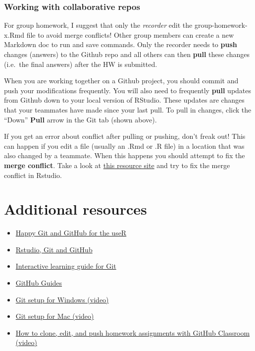 \documentclass[
]{book}
\providecommand{\tightlist}{%
  \setlength{\itemsep}{0pt}\setlength{\parskip}{0pt}}
\begin{document}
\hypertarget{working-with-collaborative-repos}{%
\subsubsection{Working with collaborative repos}\label{working-with-collaborative-repos}}

For group homework, I suggest that only the \emph{recorder} edit the group-homework-x.Rmd file to avoid merge conflicts! Other group members can create a new Markdown doc to run and save commands. Only the recorder needs to \textbf{push} changes (answers) to the Github repo and all others can then \textbf{pull} these changes (i.e.~the final answers) after the HW is submitted.

When you are working together on a Github project, you should commit and push your modifications frequently. You will also need to frequently \textbf{pull} updates from Github down to your local version of RStudio. These updates are changes that your teammates have made since your last pull. To pull in changes, click the ``Down'' \textbf{Pull} arrow in the Git tab (shown above).

If you get an error about conflict after pulling or pushing, don't freak out! This can happen if you edit a file (usually an .Rmd or .R file) in a location that was also changed by a teammate. When this happens you should attempt to fix the \textbf{merge conflict}. Take a look at \href{http://r-pkgs.had.co.nz/git.html\#git-pull}{this resource site} and try to fix the merge conflict in Rstudio.

\hypertarget{additional-resources}{%
\section{Additional resources}\label{additional-resources}}

\begin{itemize}
\tightlist
\item
  \href{http://happygitwithr.com/}{Happy Git and GitHub for the useR}
\item
  \href{http://r-pkgs.had.co.nz/git.html\#git-rstudio}{Rstudio, Git and GitHub}
\item
  \href{http://learngitbranching.js.org/}{Interactive learning guide for Git}
\item
  \href{https://guides.github.com/}{GitHub Guides}
\item
  \href{https://youtu.be/F_fPEMnr1OQ}{Git setup for Windows (video)}
\item
  \href{https://www.youtube.com/watch?v=kbmSZwK0k-A\&t}{Git setup for Mac (video)}
\item
  \href{https://youtu.be/pAcMgGbCtQw}{How to clone, edit, and push homework assignments with GitHub Classroom (video)}
\end{itemize}
\end{document}
